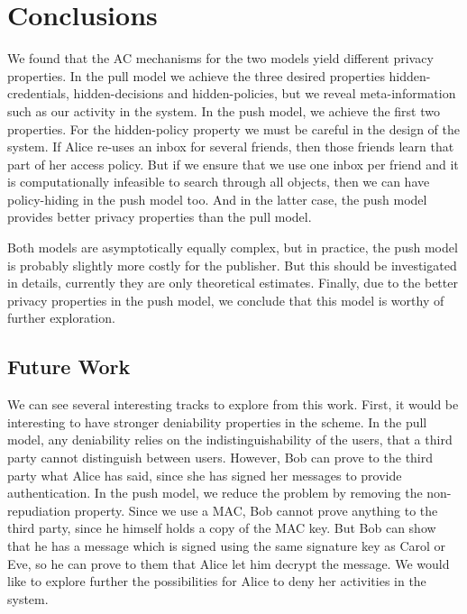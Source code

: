\section{Conclusions}\label{sec:Conclusions}

We found that the \ac{AC} mechanisms for the two models yield different privacy 
properties.
In the pull model we achieve the three desired properties hidden-credentials, 
hidden-decisions and hidden-policies, but we reveal meta-information such as 
our activity in the system.
In the push model, we achieve the first two properties.
For the hidden-policy property we must be careful in the design of the system.
If Alice re-uses an inbox for several friends, then those friends learn that 
part of her access policy.
But if we ensure that we use one inbox per friend and it is computationally 
infeasible to search through all objects, then we can have policy-hiding in the 
push model too.
And in the latter case, the push model provides better privacy properties than 
the pull model.

Both models are asymptotically equally complex, but in practice, the push model 
is probably slightly more costly for the publisher.
But this should be investigated in details, currently they are only theoretical 
estimates.
Finally, due to the better privacy properties in the push model, we conclude 
that this model is worthy of further exploration.

\subsection{Future Work}

We can see several interesting tracks to explore from this work.
First, it would be interesting to have stronger deniability properties in the 
scheme.
In the pull model, any deniability relies on the indistinguishability of the 
users, that a third party cannot distinguish between users.
However, Bob can prove to the third party what Alice has said, since she has 
signed her messages to provide authentication.
In the push model, we reduce the problem by removing the non-repudiation 
property.
Since we use a \ac{MAC}, Bob cannot prove anything to the third party, since he 
himself holds a copy of the \ac{MAC} key.
But Bob can show that he has a message which is signed using the same signature 
key as Carol or Eve, so he can prove to them that Alice let him decrypt the 
message.
We would like to explore further the possibilities for Alice to deny her 
activities in the system.

